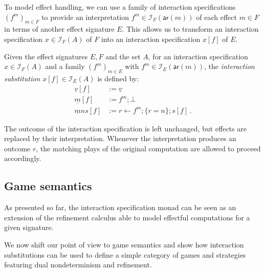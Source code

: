 \documentclass[sigplan,10pt,review,anonymous]{acmart}
\newcommand{\kw}[1]{\ensuremath{ \mathsf{#1} }}
\begin{document}
To model effect handling,
we can use a family of interaction specifications
$(f^m)_{m \in F}$
to provide an interpretation $f^m \in \mathcal{I}_F(\kw{ar}(m))$
of each effect $m \in F$
in terms of another effect signature $E$.
This allows us to transform an interaction specification
$x \in \mathcal{I}_F(A)$ of $F$
into an interaction specification
$x[f]$ of $E$.

\begin{definition}
Given the effect signatures $E, F$ and the set $A$,
for an interaction specification $x \in \mathcal{I}_F(A)$
and a family $(f^m)_{m \in E}$ with $f^m \in \mathcal{I}_E(\kw{ar}(m))$,
the \emph{interaction substitution} $x[f] \in \mathcal{I}_E(A)$
is defined by:
\begin{align*}
  \underline{v}[f] &:= \underline{v} \\
  \underline{m}[f] &:= f^m ; \bot \\
  \underline{m}ns[f] &:= r \leftarrow f^m ; \{r = n\} ; s[f] \,.
\end{align*}
\end{definition}

The outcome of the interaction specification is left unchanged,
but effects are replaced by their interpretation.
Whenever the interpretation produces an outcome $r$,
the matching plays of the original computation
are allowed to proceed accordingly.


\subsection{Game semantics} %

As presented so far,
the interaction specification monad
can be seen as an extension of the refinement calculus
able to model effectful computations
for a given signature.

We now shift our point of view to game semantics
and show how interaction substitutions
can be used to define a simple category of games and strategies
featuring dual nondeterminism and refinement.
\end{document}
